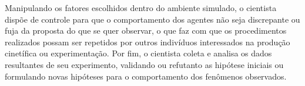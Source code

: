 Manipulando os fatores escolhidos dentro do ambiente simulado, o cientista dispõe de controle para que o comportamento dos agentes não seja discrepante ou fuja da proposta do que se quer observar, o que faz com que os procedimentos realizados possam ser repetidos por outros indivíduos interessados na produção cinetífica ou experimentação. Por fim, o cientista coleta e analisa os dados resultantes de seu experimento, validando ou refutanto as hipótese iniciais ou formulando novas hipóteses para o comportamento dos fenômenos observados.
